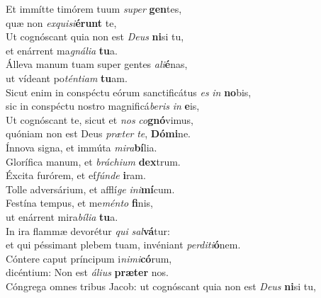 \evenverse Et immítte timórem tuum \textit{su}\textit{per} \textbf{gen}tes,~\*\\
\evenverse quæ non \textit{ex}\textit{qui}\textit{si}\textbf{é}\textbf{runt} te,\\
\oddverse Ut cognóscant quia non est \textit{De}\textit{us} \textbf{ni}si tu,~\*\\
\oddverse et enárrent ma\textit{gná}\textit{li}\textit{a} \textbf{tu}a.\\
\evenverse Álleva manum tuam super gentes \textit{a}\textit{li}\textbf{é}nas,~\*\\
\evenverse ut vídeant po\textit{tén}\textit{ti}\textit{am} \textbf{tu}am.\\
\oddverse Sicut enim in conspéctu eórum sanctificátus \textit{es} \textit{in} \textbf{no}bis,~\*\\
\oddverse sic in conspéctu nostro magnificá\textit{be}\textit{ris} \textit{in} \textbf{e}is,\\
\evenverse Ut cognóscant te, sicut et \textit{nos} \textit{co}\textbf{gnó}vimus,~\*\\
\evenverse quóniam non est Deus \textit{præ}\textit{ter} \textit{te}, \textbf{Dó}\textbf{mi}ne.\\
\oddverse Ínnova signa, et immúta \textit{mi}\textit{ra}\textbf{bí}lia.~\*\\
\oddverse Glorífica manum, et \textit{brá}\textit{chi}\textit{um} \textbf{dex}trum.\\
\evenverse Éxcita furórem, et ef\textit{fún}\textit{de} \textbf{i}ram.~\*\\
\evenverse Tolle adversárium, et afflí\textit{ge} \textit{i}\textit{ni}\textbf{mí}cum.\\
\oddverse Festína tempus, et me\textit{mén}\textit{to} \textbf{fi}nis,~\*\\
\oddverse ut enárrent mira\textit{bí}\textit{li}\textit{a} \textbf{tu}a.\\
\evenverse In ira flammæ devorétur \textit{qui} \textit{sal}\textbf{vá}tur:~\*\\
\evenverse et qui péssimant plebem tuam, invéniant \textit{per}\textit{di}\textit{ti}\textbf{ó}nem.\\
\oddverse Cóntere caput príncipum i\textit{ni}\textit{mi}\textbf{có}rum,~\*\\
\oddverse dicéntium: Non est \textit{á}\textit{li}\textit{us} \textbf{præ}\textbf{ter} nos.\\
\evenverse Cóngrega omnes tribus Jacob: ut cognóscant quia non est \textit{De}\textit{us} \textbf{ni}si tu,~\*\\
